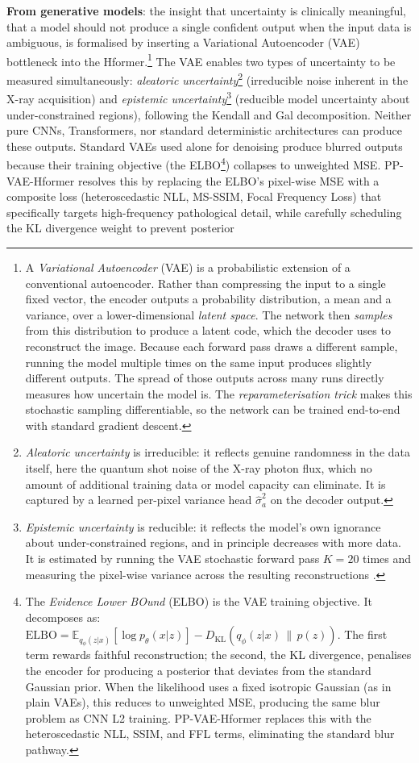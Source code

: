 \documentclass[12pt, a4paper, twoside, openright]{book}
\begin{document}
\textbf{From generative models}: the insight that uncertainty is clinically meaningful, that a model should not produce a single confident output when the input data is ambiguous, is formalised by inserting a Variational Autoencoder (VAE) bottleneck \cite{kingma_auto-encoding_2014} into the Hformer.\footnote{A \emph{Variational Autoencoder} (VAE) \cite{kingma_auto-encoding_2014} is a probabilistic extension of a conventional autoencoder. Rather than compressing the input to a single fixed vector, the encoder outputs a probability distribution, a mean and a variance, over a lower-dimensional \emph{latent space}. The network then \emph{samples} from this distribution to produce a latent code, which the decoder uses to reconstruct the image. Because each forward pass draws a different sample, running the model multiple times on the same input produces slightly different outputs. The spread of those outputs across many runs directly measures how uncertain the model is. The \emph{reparameterisation trick} \cite{kingma_auto-encoding_2014} makes this stochastic sampling differentiable, so the network can be trained end-to-end with standard gradient descent.} The VAE enables two types of uncertainty to be measured simultaneously: \emph{aleatoric uncertainty}\footnote{\emph{Aleatoric uncertainty} is irreducible: it reflects genuine randomness in the data itself, here the quantum shot noise of the X-ray photon flux, which no amount of additional training data or model capacity can eliminate. It is captured by a learned per-pixel variance head $\hat{\sigma}^2_a$ on the decoder output.} (irreducible noise inherent in the X-ray acquisition) and \emph{epistemic uncertainty}\footnote{\emph{Epistemic uncertainty} is reducible: it reflects the model's own ignorance about under-constrained regions, and in principle decreases with more data. It is estimated by running the VAE stochastic forward pass $K=20$ times and measuring the pixel-wise variance across the resulting reconstructions \cite{kendall_what_2017}.} (reducible model uncertainty about under-constrained regions), following the Kendall and Gal \cite{kendall_what_2017} decomposition. Neither pure CNNs, Transformers, nor standard deterministic architectures can produce these outputs. Standard VAEs used alone for denoising produce blurred outputs because their training objective (the ELBO\footnote{The \emph{Evidence Lower BOund} (ELBO) is the VAE training objective. It decomposes as: $\mathrm{ELBO} = \mathbb{E}_{q_\phi(z|x)}[\log p_\theta(x|z)] - D_{\mathrm{KL}}(q_\phi(z|x)\,\|\,p(z))$. The first term rewards faithful reconstruction; the second, the KL divergence, penalises the encoder for producing a posterior that deviates from the standard Gaussian prior. When the likelihood uses a fixed isotropic Gaussian (as in plain VAEs), this reduces to unweighted MSE, producing the same blur problem as CNN L2 training. PP-VAE-Hformer replaces this with the heteroscedastic NLL, SSIM, and FFL terms, eliminating the standard blur pathway.}) collapses to unweighted MSE. PP-VAE-Hformer resolves this by replacing the ELBO's pixel-wise MSE with a composite loss (heteroscedastic NLL, MS-SSIM, Focal Frequency Loss) that specifically targets high-frequency pathological detail, while carefully scheduling the KL divergence weight to prevent posterior 
\end{document}
